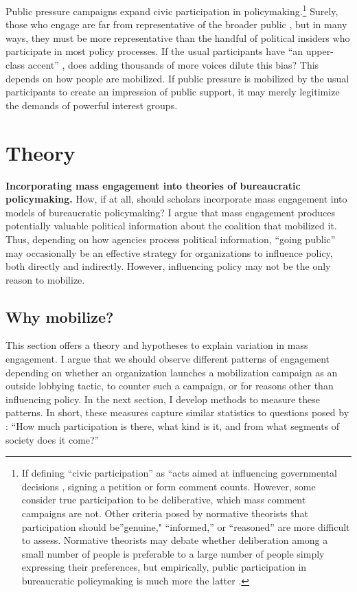 \documentclass[
      12pt,
        ]{article}
\begin{document}
Public pressure campaigns expand civic participation in policymaking.\footnote{If defining ``civic participation'' as ``acts aimed at influencing governmental decisions \citep[ p.~2]{Verba1987}, signing a petition or form comment counts. However, some consider true
  participation to be deliberative, which mass comment campaigns are not.
  Other criteria posed by normative theorists that participation should be''genuine," ``informed,'' or ``reasoned'' are more difficult to assess. Normative theorists may debate whether deliberation among a small number of people is preferable to a large number of people simply expressing their preferences, but empirically, public participation in bureaucratic policymaking is much more the latter \citep{Shapiro2008b}.}
Surely, those who engage are far from representative of the broader public \citep{Verba1987}, but in many ways, they must be more representative than the handful of political insiders who participate in most policy processes. If the usual participants have ``an upper-class accent'' \citep{Schattschneider1942}, does adding thousands of more voices dilute this bias? This depends on how people are mobilized. If public pressure is mobilized by the usual participants to create an impression of public support, it may merely legitimize the demands of powerful interest groups.

\hypertarget{theory}{%
\section{Theory}\label{theory}}

\textbf{Incorporating mass engagement into theories of bureaucratic policymaking.}
How, if at all, should scholars incorporate mass engagement into models of bureaucratic policymaking?
I argue that mass engagement produces potentially valuable political information about the coalition that mobilized it.
Thus, depending on how agencies process political information, ``going public'' may occasionally be an effective strategy for organizations to influence policy, both directly and indirectly. However, influencing policy may not be the only reason to mobilize.

\hypertarget{why-mobilize}{%
\subsection{Why mobilize?}\label{why-mobilize}}

This section offers a theory and hypotheses to explain variation in mass
engagement. I argue that we should observe different patterns of
engagement depending on whether an organization launches a mobilization
campaign as an outside lobbying tactic, to counter such a campaign, or
for reasons other than influencing policy. In the next section, I
develop methods to measure these patterns. In short, these measures
capture similar statistics to questions posed by \citet[p.~9]{Verba1987}: ``How
much participation is there, what kind is it, and from what segments of
society does it come?''
\end{document}
